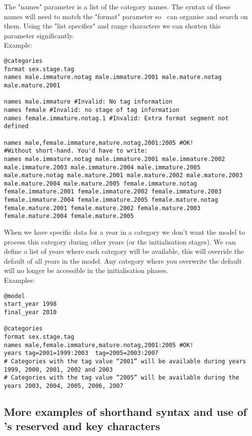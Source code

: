 The "names" parameter is a list of the category names. The syntax of these names will need to match the "format" parameter so \CNAME\ can organise and search on them. Using the "list specifier" and range characters we can shorten this parameter significantly.\\
Example:
{\small{\begin{verbatim}
@categories
format sex.stage.tag
names male.immature.notag male.immature.2001 male.mature.notag male.mature.2001

names male.immature #Invalid: No tag information
names female #Invalid: no stage of tag information
names female.immature.notag.1 #Invalid: Extra format segment not defined

names male,female.immature,mature.notag,2001:2005 #OK!
#Without short-hand. You'd have to write:
names male.immature.notag male.immature.2001 male.immature.2002 male.immature.2003 male.immature.2004 male.immature.2005 male.mature.notag male.mature.2001 male.mature.2002 male.mature.2003 male.mature.2004 male.mature.2005 female.immature.notag female.immature.2001 female.immature.2002 female.immature.2003 female.immature.2004 female.immature.2005 female.mature.notag female.mature.2001 female.mature.2002 female.mature.2003 female.mature.2004 female.mature.2005
\end{verbatim}}}

When we have specific data for a year in a category we don't want the model to process this category during other years (or the initialisation stages). We can define a list of years where each category will be available, this will override the default of all years in the model. Any category where you overwrite the default will no longer be accessible in the initialisation phases.
\\
Examples:
{\small{\begin{verbatim}
@model
start_year 1998
final_year 2010

@categories
format sex.stage.tag
names male,female.immature,mature.notag,2001:2005 #OK!
years tag=2001=1999:2003  tag=2005=2003:2007
# Categories with the tag value “2001” will be available during years 1999, 2000, 2001, 2002 and 2003
# Categories with the tag value “2005” will be available during the years 2003, 2004, 2005, 2006, 2007
\end{verbatim}}}

\subsection{More examples of shorthand syntax and use of \CNAME's reserved and key characters}\label{sec:ShorthandSyntax-section}

